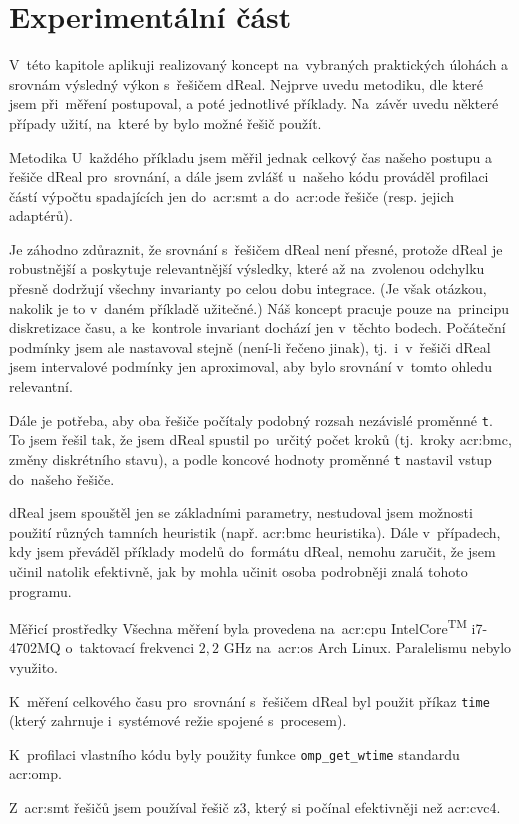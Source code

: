 \documentclass[thesis=M,czech]{FITthesis}[2012/06/26]
\newcommand{\acrlabel}[1]{acr:#1}
\newcommand{\acr}[1]{\acrshort{\acrlabel{#1}}}
\newcommand{\id}[1]{\texttt{#1}}
\newcommand{\reg}{\textsuperscript{\textregistered}}
\begin{document}
\chapter{Experimentální část}\label{ch:exp}
V~této kapitole aplikuji realizovaný koncept
na~vybraných praktických úlohách
a srovnám výsledný výkon s~řešičem dReal.
Nejprve uvedu metodiku,
dle které jsem při~měření postupoval,
a poté jednotlivé příklady.
Na~závěr uvedu některé případy užití,
na~které by bylo možné řešič použít.


\begin{section}{Metodika}\label{s:exp:method}
U~každého příkladu jsem měřil jednak celkový čas
našeho postupu a řešiče dReal pro~srovnání,
a dále jsem zvlášť u~našeho kódu prováděl
profilaci částí výpočtu spadajících
jen do~\acr{smt} a do~\acr{ode} řešiče
(resp. jejich adaptérů).

Je záhodno zdůraznit, že srovnání
s~řešičem dReal není přesné,
protože dReal je robustnější a poskytuje
relevantnější výsledky, které až na~zvolenou odchylku
přesně dodržují všechny invarianty po celou dobu integrace.
(Je však otázkou, nakolik je to v~daném příkladě užitečné.)
Náš koncept pracuje pouze na~principu diskretizace času,
a ke~kontrole invariant dochází jen v~těchto bodech.
Počáteční podmínky jsem ale nastavoval stejně (není-li řečeno jinak),
tj.~i~v~řešiči dReal jsem intervalové podmínky jen aproximoval,
aby bylo srovnání v~tomto ohledu relevantní.

Dále je potřeba, aby oba řešiče počítaly
podobný rozsah nezávislé proměnné \id{t}.
To jsem řešil tak, že jsem dReal spustil
po~určitý počet kroků (tj.~kroky \acr{bmc}, změny diskrétního stavu),
a podle koncové hodnoty proměnné \id{t}
nastavil vstup do~našeho řešiče.

dReal jsem spouštěl jen se základními parametry,
nestudoval jsem možnosti použití různých tamních heuristik
(např. \acr{bmc} heuristika).
Dále v~případech, kdy jsem převáděl příklady modelů
do~formátu dReal, nemohu zaručit,
že jsem učinil natolik efektivně,
jak by mohla učinit osoba
podrobněji znalá tohoto programu.


\begin{subsection}{Měřicí prostředky}\label{ss:exp:method:resources}
Všechna měření byla provedena
na~\acr{cpu}
Intel\reg Core\textsuperscript{TM}
i7-4702MQ o~taktovací frekvenci $2{,}2$ GHz
na~\acr{os} Arch Linux.
Paralelismu nebylo využito.

K~měření celkového času pro~srovnání s~řešičem dReal
byl použit příkaz \id{time}
(který zahrnuje i~systémové režie spojené s~procesem).

K~profilaci vlastního kódu byly použity
funkce \id{omp\_\-get\_\-wtime}
standardu \acr{omp}.

Z~\acr{smt} řešičů jsem používal řešič z3,
který si počínal efektivněji než \acr{cvc}4.
\end{subsection} %


\end{section} %
\end{document}
